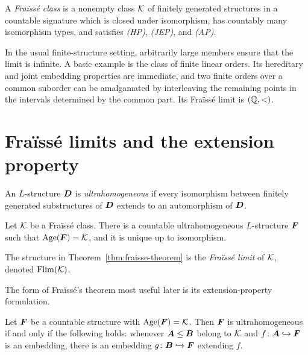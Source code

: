 \begin{definition}
    A \emph{Fraïssé class} is a nonempty class \(\mathcal{K}\) of finitely
    generated structures in a countable signature which is closed under
    isomorphism, has countably many isomorphism types, and satisfies
    \emph{(HP)}, \emph{(JEP)}, and \emph{(AP)}.
\end{definition}

In the usual finite-structure setting, arbitrarily large members ensure that
the limit is infinite.  A basic example is the class of finite linear orders.
Its hereditary and joint
embedding properties are immediate, and two finite orders over a common
suborder can be amalgamated by interleaving the remaining points in the
intervals determined by the common part.  Its Fraïssé limit is
\((\mathbb{Q},<)\).

\section{Fraïssé limits and the extension property}

\begin{definition}
    An \(L\)-structure \(\boldsymbol{D}\) is \emph{ultrahomogeneous} if every isomorphism
    between finitely generated substructures of \(\boldsymbol{D}\) extends to an
    automorphism of \(\boldsymbol{D}\).
\end{definition}

\begin{theorem}[Fraïssé]
    \label{thm:fraisse-theorem}
    Let \(\mathcal{K}\) be a Fraïssé class.  There is a countable
    ultrahomogeneous \(L\)-structure \(\boldsymbol{F}\) such that
    \(\operatorname{Age}(\boldsymbol{F})=\mathcal{K}\), and it is unique up to isomorphism.
\end{theorem}

\begin{definition}
    The structure in Theorem~\ref{thm:fraisse-theorem} is the
    \emph{Fraïssé limit} of \(\mathcal{K}\), denoted
    \(\operatorname{Flim}(\mathcal{K})\).
\end{definition}

The form of Fraïssé's theorem most useful later is its extension-property
formulation.

\begin{proposition}
    \label{prop:fraisse-extension-property}
    Let \(\boldsymbol{F}\) be a countable structure with \(\operatorname{Age}(\boldsymbol{F})=\mathcal{K}\).  Then \(\boldsymbol{F}\)
    is ultrahomogeneous if and only if the following holds:
    whenever \(\boldsymbol{A}\leq \boldsymbol{B}\) belong to \(\mathcal{K}\) and
    \(f\colon \boldsymbol{A}\hookrightarrow \boldsymbol{F}\) is an embedding, there is an embedding
    \(g\colon \boldsymbol{B}\hookrightarrow \boldsymbol{F}\) extending \(f\).
\end{proposition}

